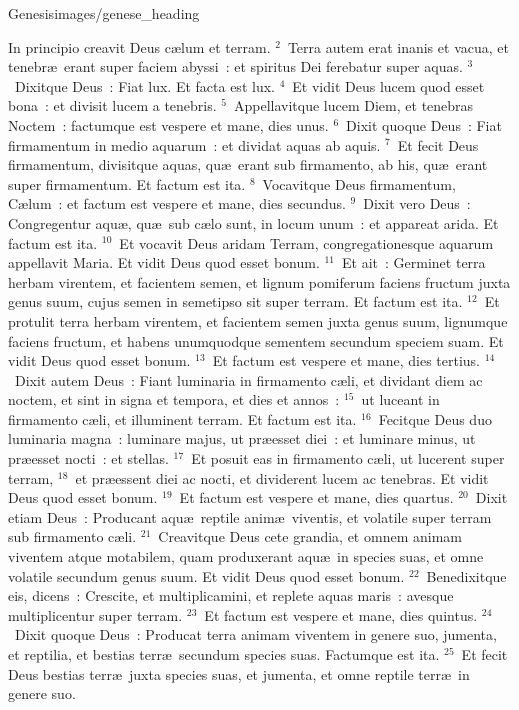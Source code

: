 {Genesis}{images/genese_heading}


\lettrine[lines=10,image=true,loversize=0.05,lraise=-0.03]{I}{}n principio creavit Deus c\ae lum et terram.
${}^{2}$~Terra autem erat inanis et vacua, et tenebr\ae\ erant super faciem abyssi~: et spiritus Dei ferebatur super aquas.
${}^{3}$~Dixitque Deus~: Fiat lux. Et facta est lux.
${}^{4}$~Et vidit Deus lucem quod esset bona~: et divisit lucem a tenebris.
${}^{5}$~Appellavitque lucem Diem, et tenebras Noctem~: factumque est vespere et mane, dies unus.
${}^{6}$~Dixit quoque Deus~: Fiat firmamentum in medio aquarum~: et dividat aquas ab aquis.
${}^{7}$~Et fecit Deus firmamentum, divisitque aquas, qu\ae\ erant sub firmamento, ab his, qu\ae\ erant super firmamentum. Et factum est ita.
${}^{8}$~Vocavitque Deus firmamentum, C\ae lum~: et factum est vespere et mane, dies secundus.
${}^{9}$~Dixit vero Deus~: Congregentur aqu\ae , qu\ae\ sub c\ae lo sunt, in locum unum~: et appareat arida. Et factum est ita.
${}^{10}$~Et vocavit Deus aridam Terram, congregationesque aquarum appellavit Maria. Et vidit Deus quod esset bonum.
${}^{11}$~Et ait~: Germinet terra herbam virentem, et facientem semen, et lignum pomiferum faciens fructum juxta genus suum, cujus semen in semetipso sit super terram. Et factum est ita.
${}^{12}$~Et protulit terra herbam virentem, et facientem semen juxta genus suum, lignumque faciens fructum, et habens unumquodque sementem secundum speciem suam. Et vidit Deus quod esset bonum.
${}^{13}$~Et factum est vespere et mane, dies tertius.
${}^{14}$~Dixit autem Deus~: Fiant luminaria in firmamento c\ae li, et dividant diem ac noctem, et sint in signa et tempora, et dies et annos~:
${}^{15}$~ut luceant in firmamento c\ae li, et illuminent terram. Et factum est ita.
${}^{16}$~Fecitque Deus duo luminaria magna~: luminare majus, ut pr\ae esset diei~: et luminare minus, ut pr\ae esset nocti~: et stellas.
${}^{17}$~Et posuit eas in firmamento c\ae li, ut lucerent super terram,
${}^{18}$~et pr\ae essent diei ac nocti, et dividerent lucem ac tenebras. Et vidit Deus quod esset bonum.
${}^{19}$~Et factum est vespere et mane, dies quartus.
${}^{20}$~Dixit etiam Deus~: Producant aqu\ae\ reptile anim\ae\ viventis, et volatile super terram sub firmamento c\ae li.
${}^{21}$~Creavitque Deus cete grandia, et omnem animam viventem atque motabilem, quam produxerant aqu\ae\ in species suas, et omne volatile secundum genus suum. Et vidit Deus quod esset bonum.
${}^{22}$~Benedixitque eis, dicens~: Crescite, et multiplicamini, et replete aquas maris~: avesque multiplicentur super terram.
${}^{23}$~Et factum est vespere et mane, dies quintus.
${}^{24}$~Dixit quoque Deus~: Producat terra animam viventem in genere suo, jumenta, et reptilia, et bestias terr\ae\ secundum species suas. Factumque est ita.
${}^{25}$~Et fecit Deus bestias terr\ae\ juxta species suas, et jumenta, et omne reptile terr\ae\ in genere suo.

